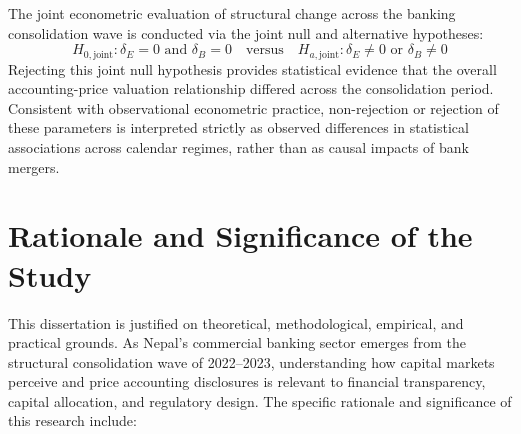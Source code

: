 The joint econometric evaluation of structural change across the banking consolidation wave is conducted via the joint null and alternative hypotheses:
\begin{equation}
H_{0,\text{joint}}: \delta_E = 0 \text{ and } \delta_B = 0 \quad \text{versus} \quad H_{a,\text{joint}}: \delta_E \ne 0 \text{ or } \delta_B \ne 0
\end{equation}
Rejecting this joint null hypothesis provides statistical evidence that the overall accounting-price valuation relationship differed across the consolidation period. Consistent with observational econometric practice, non-rejection or rejection of these parameters is interpreted strictly as observed differences in statistical associations across calendar regimes, rather than as causal impacts of bank mergers.

\section{Rationale and Significance of the Study}
\label{sec:rationale}

This dissertation is justified on theoretical, methodological, empirical, and practical grounds. As Nepal's commercial banking sector emerges from the structural consolidation wave of 2022--2023, understanding how capital markets perceive and price accounting disclosures is relevant to financial transparency, capital allocation, and regulatory design. The specific rationale and significance of this research include:

